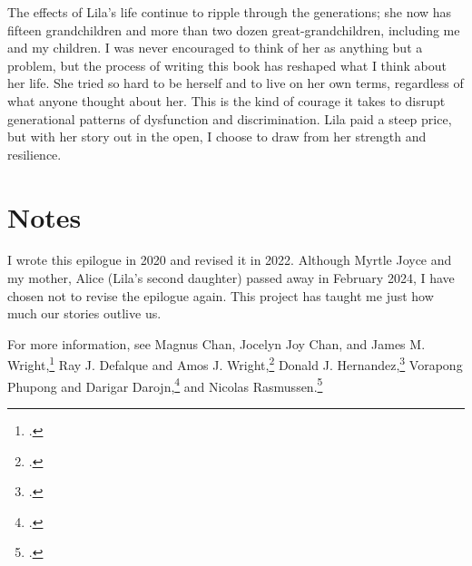 \documentclass[
  american,
  letterpaper,
]{book}
\begin{document}
The effects of Lila's life continue to ripple through the generations;
she now has fifteen grandchildren and more than two dozen
great-grandchildren, including me and my children. I was never
encouraged to think of her as anything but a problem, but the process of
writing this book has reshaped what I think about her life. She tried so
hard to be herself and to live on her own terms, regardless of what
anyone thought about her. This is the kind of courage it takes to
disrupt generational patterns of dysfunction and discrimination. Lila
paid a steep price, but with her story out in the open, I choose to draw
from her strength and resilience.

\section{Notes}\label{notes-60}

I wrote this epilogue in 2020 and revised it in 2022. Although Myrtle
Joyce and my mother, Alice (Lila's second daughter) passed away in
February 2024, I have chosen not to revise the epilogue again. This
project has taught me just how much our stories outlive us.

For more information, see Magnus Chan, Jocelyn Joy Chan, and James M.
Wright,\footnote{.} Ray
J. Defalque and Amos J. Wright,\footnote{.} Donald J.
Hernandez,\footnote{.} Vorapong Phupong and Darigar
Darojn,\footnote{.} and Nicolas
Rasmussen.\footnote{.}
\end{document}
